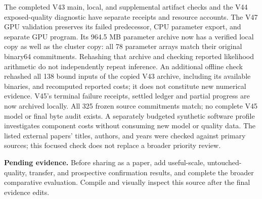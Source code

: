 \documentclass[10pt,twocolumn,letterpaper]{article}
\newcommand{\pending}[1]{\par\noindent\textbf{Pending evidence.} #1\par}
\begin{document}
The completed V43 main, local, and supplemental artifact checks and the V44
exposed-quality diagnostic have separate receipts and resource accounts. The
V47 GPU validation preserves its failed predecessor, CPU parameter export, and
separate GPU program. Its 964.5 MB parameter archive now has a verified local
copy as well as the cluster copy: all 78 parameter arrays match their original
binary64 commitments. Rehashing that archive and checking reported likelihood
arithmetic do not independently repeat inference.
An additional offline check rehashed all 138 bound inputs of the copied V43
archive, including its available binaries, and recomputed reported costs; it
does not constitute new numerical evidence. V45's terminal failure receipts,
settled ledger and partial progress are now archived locally. All 325 frozen
source commitments match; no complete V45 model or final byte audit exists.
A separately budgeted synthetic software profile investigates component costs
without consuming new model or quality data. The listed external papers' titles,
authors, and years were checked against primary
sources; this focused check does not replace a broader priority review.

\pending{Before sharing as a paper, add useful-scale, untouched-quality,
transfer, and prospective confirmation results, and complete the broader
comparative evaluation. Compile and visually inspect this source after the final
evidence edits.}
\end{document}
